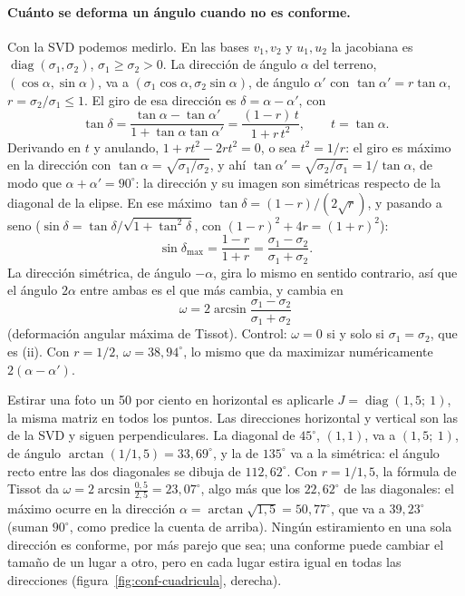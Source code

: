 \paragraph{Cuánto se deforma un ángulo cuando no es conforme.} Con la SVD podemos
medirlo. En las bases \(v_1,v_2\) y \(u_1,u_2\) la jacobiana es \(\operatorname{diag}(\sigma_1,\sigma_2)\),
\(\sigma_1\ge\sigma_2>0\). La dirección de ángulo \(\alpha\) del terreno,
\((\cos\alpha,\sin\alpha)\), va a \((\sigma_1\cos\alpha,\sigma_2\sin\alpha)\), de ángulo
\(\alpha'\) con \(\tan\alpha'=r\tan\alpha\), \(r=\sigma_2/\sigma_1\le1\). El giro de esa
dirección es \(\delta=\alpha-\alpha'\), con
\[
  \tan\delta=\frac{\tan\alpha-\tan\alpha'}{1+\tan\alpha\tan\alpha'}
  =\frac{(1-r)\,t}{1+r\,t^2},\qquad t=\tan\alpha .
\]
Derivando en \(t\) y anulando, \(1+rt^2-2rt^2=0\), o sea \(t^2=1/r\): el giro es máximo
en la dirección con \(\tan\alpha=\sqrt{\sigma_1/\sigma_2}\), y ahí
\(\tan\alpha'=\sqrt{\sigma_2/\sigma_1}=1/\tan\alpha\), de modo que \(\alpha+\alpha'=90^\circ\):
la dirección y su imagen son simétricas respecto de la diagonal de la elipse. En ese
máximo \(\tan\delta=(1-r)/(2\sqrt r)\), y pasando a seno
(\(\sin\delta=\tan\delta/\sqrt{1+\tan^2\delta}\), con \((1-r)^2+4r=(1+r)^2\)):
\[
  \sin\delta_{\max}=\frac{1-r}{1+r}=\frac{\sigma_1-\sigma_2}{\sigma_1+\sigma_2}.
\]
La dirección simétrica, de ángulo \(-\alpha\), gira lo mismo en sentido contrario, así
que el ángulo \(2\alpha\) entre ambas es el que más cambia, y cambia en
\[
  \boxed{\ \omega=2\arcsin\frac{\sigma_1-\sigma_2}{\sigma_1+\sigma_2}\ }
\]
(deformación angular máxima de Tissot). Control: \(\omega=0\) si y solo si
\(\sigma_1=\sigma_2\), que es (ii). Con \(r=1/2\), \(\omega=38{,}94^\circ\), lo mismo
que da maximizar numéricamente \(2(\alpha-\alpha')\).

\begin{ejemplo}\label{ej:conf-foto}
Estirar una foto un 50 por ciento en horizontal es aplicarle \(J=\operatorname{diag}(1{,}5;\ 1)\),
la misma matriz en todos los puntos. Las direcciones horizontal y vertical son las de la SVD
y siguen perpendiculares. La diagonal de \(45^\circ\), \((1,1)\), va a \((1{,}5;\ 1)\), de
ángulo \(\arctan(1/1{,}5)=33{,}69^\circ\), y la de \(135^\circ\) va a la simétrica: el ángulo
recto entre las dos diagonales se dibuja de \(112{,}62^\circ\). Con \(r=1/1{,}5\), la fórmula de
Tissot da \(\omega=2\arcsin\frac{0{,}5}{2{,}5}=23{,}07^\circ\), algo más que los
\(22{,}62^\circ\) de las diagonales: el máximo ocurre en la dirección
\(\alpha=\arctan\sqrt{1{,}5}=50{,}77^\circ\), que va a \(39{,}23^\circ\) (suman \(90^\circ\), como
predice la cuenta de arriba). Ningún estiramiento en una sola dirección es conforme, por más
parejo que sea; una conforme puede cambiar el tamaño de un lugar a otro, pero en cada lugar
estira igual en todas las direcciones (figura~\ref{fig:conf-cuadricula}, derecha).
\end{ejemplo}

